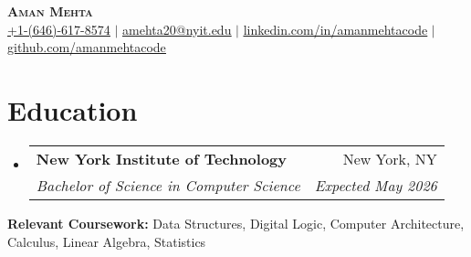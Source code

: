 \documentclass[letterpaper,11pt]{article}
\makeatletter
\newcommand{\resumeSubheading}[4]{
\vspace{-2pt}\item
\begin{tabular*}{0.97\textwidth}[t]{l@{\extracolsep{\fill}}r}
\textbf{#1} & #2 \\
\textit{\small#3} & \textit{\small #4} \\
\end{tabular*}\vspace{-7pt}
}
\newcommand{\resumeSubHeadingListStart}{\begin{itemize}[leftmargin=0.15in, label={}]}
\newcommand{\resumeSubHeadingListEnd}{\end{itemize}}
\makeatother
\begin{document}





\begin{center}
\vspace*{-0.25cm} %

\textbf{\Huge \scshape Aman Mehta} \\ \vspace{0pt}
\href{tel:+16466178574}{\underline{+1-(646)-617-8574}} $|$ \href{mailto:amehta20@nyit.edu}{\underline{amehta20@nyit.edu}} $|$ 
\href{https://www.linkedin.com/in/amanmehtacode/}{\underline{linkedin.com/in/amanmehtacode}} $|$ 
\href{https://github.com/amanmehtacode}{\underline{github.com/amanmehtacode}}
\end{center}


\section{Education}
\resumeSubHeadingListStart
\resumeSubheading
{New York Institute of Technology}{New York, NY}
{Bachelor of Science in Computer Science}{Expected May 2026}
\resumeSubHeadingListEnd

\begin{itemize}[leftmargin=0.15in, label={}]
\small{\item{\textbf{Relevant Coursework:}  Data Structures, Digital Logic, Computer Architecture, Calculus, Linear Algebra, Statistics}
}\end{itemize}


\end{document}
